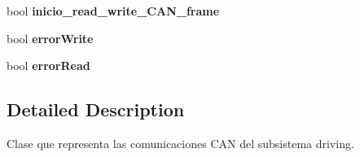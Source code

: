 \begin{DoxyCompactItemize}
\item 
\hypertarget{class_c_a_n_communication_ad533c50a8293ca93faa31990b96b1fcd}{bool {\bfseries inicio\-\_\-read\-\_\-write\-\_\-\-C\-A\-N\-\_\-frame}}\label{class_c_a_n_communication_ad533c50a8293ca93faa31990b96b1fcd}

\item 
\hypertarget{class_c_a_n_communication_a5d75d2d21f673a161e902ccbc4821512}{bool {\bfseries error\-Write}}\label{class_c_a_n_communication_a5d75d2d21f673a161e902ccbc4821512}

\item 
\hypertarget{class_c_a_n_communication_ab3b7a5ab3eaa6e45188fb787bf1b60d7}{bool {\bfseries error\-Read}}\label{class_c_a_n_communication_ab3b7a5ab3eaa6e45188fb787bf1b60d7}

\end{DoxyCompactItemize}


\subsection{\-Detailed \-Description}
\-Clase que representa las comunicaciones \-C\-A\-N del subsistema driving. 

